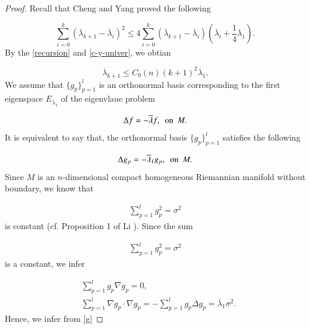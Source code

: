 \documentclass[12pt]{article}
\numberwithin{equation}{section}
\begin{document}
\begin{proof}
Recall that Cheng and Yang \cite{CY2} proved the following


\begin{equation}\label{c-y-univer}\sum^{k}_{i=0}(\overline{\lambda}_{k+1}-\overline{\lambda}_{i})^{2} \leq 4\sum^{k}_{i=0}
(\overline{\lambda}_{k+1}-\overline{\lambda}_{i})(\overline{\lambda}_{i}+\frac{1}{4}\overline{\lambda}_{1}).\end{equation}
By the \eqref{recursion} and \eqref{c-y-univer}, we obtian

\begin{equation}\label{c-y-upper}\overline{\lambda}_{k+1}\leq C_{0}(n)(k+1)^{2}\overline{\lambda}_{1}.\end{equation}
We assume that $\{g_{p}\}^{l}  _{p=1}$ is an orthonormal basis corresponding to the first eigenspace
 $E_{\overline{\lambda}_{1}}$ of the eigenvlaue problem

 \begin{equation*}\begin{aligned}
\Delta f =-\overline{\lambda}f, \ \ {\rm on}\ \ M.\end{aligned}\end{equation*}
It is equivalent to say that, the orthonormal basis $\{g_{p}\}^{l}_{p=1}$ satisfies the following

 \begin{equation}\begin{aligned}\label{eigen-first}\Delta g_{p} =-\overline{\lambda}_{1}g_{p},\ \ {\rm on}\ \  M.
\end{aligned}\end{equation}
Since  $M$ is an $n$-dimensional compact homogeneous Riemannian manifold without
boundary, we know that

 \begin{equation*}\begin{aligned}\sum^{l}_{p=1}g^{2}_{p}=\sigma^{2}
\end{aligned}\end{equation*} is constant (cf. Proposition 1 of Li
\cite{L}). Since the sum

 \begin{equation*}\begin{aligned}\sum^{l}_{p=1} g^{2}_{p}
=\sigma^{2}
\end{aligned}\end{equation*}   is a constant, we infer

 \begin{equation}\begin{aligned}&\label{g} \sum^{l}_{p=1}
g_{p}\nabla g_{p} = 0,\\&
\sum^{l}_{p=1}
\nabla g_{p}\cdot\nabla g_{p}=-
\sum^{l}_{p=1}
g_{p}\Delta g_{p} = \overline{\lambda}_{1}\sigma^{2}.
\end{aligned}\end{equation}
Hence, we infer from \eqref{g}


\end{proof}
\end{document}
